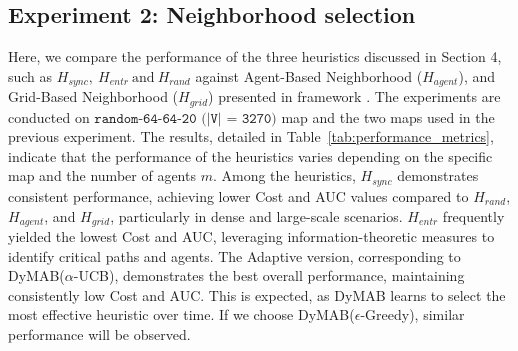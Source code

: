 \documentclass[review]{jair}
\begin{document}

\subsection{Experiment 2: Neighborhood selection}
Here, we compare the performance of the three heuristics discussed in Section 4, such as $H_{sync},\ H_{entr} \ \text{and} \ H_{rand}$ against Agent-Based Neighborhood ($H_{agent}$), and Grid-Based Neighborhood ($H_{grid}$) presented in  framework \citep{LNS}. The experiments are conducted on $\texttt{random-64-64-20 (|V| = 3270)}$ map and the two maps used in the previous experiment. The results, detailed in Table~\ref{tab:performance_metrics}, indicate that the performance of the heuristics varies depending on the specific map and the number of agents $m$. Among the heuristics, $H_{sync}$ demonstrates consistent performance, achieving lower Cost and AUC values compared to $H_{rand}$, $H_{agent}$, and $H_{grid}$, particularly in dense and large-scale scenarios. $H_{entr}$ frequently yielded the lowest Cost and AUC, leveraging information-theoretic measures to identify critical paths and agents.
The Adaptive version, corresponding to DyMAB($\alpha$-UCB), demonstrates the best overall performance, maintaining consistently low Cost and AUC. This is expected, as DyMAB learns to select the most effective heuristic over time. If we choose DyMAB($\epsilon$-Greedy), similar performance will be observed.
\end{document}
